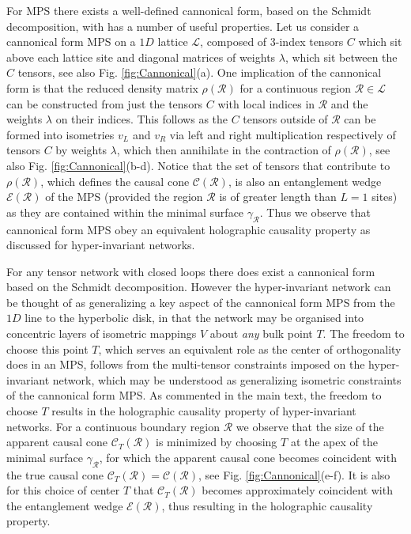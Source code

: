 \documentclass[aps,prl,twocolumn,showpacs,superscriptaddress,floatfix,10pt]{revtex4-1}
\def\E{{\mathcal E}}
\def\L{{\mathcal L}}
\def\C{{\mathcal C}}
\def\R{{\mathcal R}}
\begin{document}
For MPS there exists a well-defined cannonical form, based on the Schmidt decomposition, with has a number of useful properties. Let us consider a cannonical form MPS on a $1D$ lattice $\L$, composed of 3-index tensors $C$ which sit above each lattice site and diagonal matrices of weights $\lambda$, which sit between the $C$ tensors, see also Fig. \ref{fig:Cannonical}(a). One implication of the cannonical form is that the reduced density matrix $\rho(\R)$ for a continuous region $\R \in \L$ can be constructed from just the tensors $C$ with local indices in $\R$ and the weights $\lambda$ on their indices. This follows as the $C$ tensors outside of $\R$ can be formed into isometries $v_L$ and $v_R$ via left and right multiplication respectively of tensors $C$ by weights $\lambda$, which then annihilate in the contraction of $\rho(\R)$, see also Fig. \ref{fig:Cannonical}(b-d). Notice that the set of tensors that contribute to $\rho(\R)$, which defines the causal cone $\C(\R)$, is also an entanglement wedge $\E(\R)$ of the MPS (provided the region $\R$ is of greater length than $L=1$ sites) as they are contained within the minimal surface $\gamma_\R$. Thus we observe that cannonical form MPS obey an equivalent holographic causality property as discussed for hyper-invariant networks. 

For any tensor network with closed loops there does exist a cannonical form based on the Schmidt decomposition. However the hyper-invariant network can be thought of as generalizing a key aspect of the cannonical form MPS from the $1D$ line to the hyperbolic disk, in that the network may be organised into concentric layers of isometric mappings $V$ about \emph{any} bulk point $T$. The freedom to choose this point $T$, which serves an equivalent role as the center of orthogonality does in an MPS, follows from the multi-tensor constraints imposed on the hyper-invariant network, which may be understood as generalizing isometric constraints of the cannonical form MPS. As commented in the main text, the freedom to choose $T$ results in the holographic causality property of hyper-invariant networks. For a continuous boundary region $\R$ we observe that the size of the apparent causal cone $\C_T(\R)$ is minimized by choosing $T$ at the apex of the minimal surface $\gamma_\R$, for which the apparent causal cone becomes coincident with the true causal cone $\C_T(\R) = \C(\R)$, see Fig. \ref{fig:Cannonical}(e-f). It is also for this choice of center $T$ that $\C_T(\R)$ becomes approximately coincident with the entanglement wedge $\E(\R)$, thus resulting in the holographic causality property.
\end{document}
